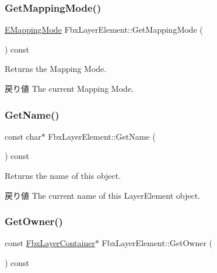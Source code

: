 \mbox{\label{class_fbx_layer_element_a3b20bf41d0b5abc9661b8b93e033cddb}} 
\subsubsection{\texorpdfstring{Get\+Mapping\+Mode()}{GetMappingMode()}}
{\footnotesize\ttfamily \hyperlink{class_fbx_layer_element_a5a40e95db30ae9f94611dc3f1568af26}{E\+Mapping\+Mode} Fbx\+Layer\+Element\+::\+Get\+Mapping\+Mode (\begin{DoxyParamCaption}{ }\end{DoxyParamCaption}) const}

Returns the Mapping Mode. \begin{DoxyReturn}{戻り値}
The current Mapping Mode. 
\end{DoxyReturn}
\mbox{\label{class_fbx_layer_element_af6ca442eaaaac61cec689cf7e39138a6}} 
\subsubsection{\texorpdfstring{Get\+Name()}{GetName()}}
{\footnotesize\ttfamily const char$\ast$ Fbx\+Layer\+Element\+::\+Get\+Name (\begin{DoxyParamCaption}{ }\end{DoxyParamCaption}) const}

Returns the name of this object. \begin{DoxyReturn}{戻り値}
The current name of this Layer\+Element object. 
\end{DoxyReturn}
\mbox{\label{class_fbx_layer_element_a1e83210626684c844505ffd115c27dfd}} 
\subsubsection{\texorpdfstring{Get\+Owner()}{GetOwner()}}
{\footnotesize\ttfamily const \hyperlink{class_fbx_layer_container}{Fbx\+Layer\+Container}$\ast$ Fbx\+Layer\+Element\+::\+Get\+Owner (\begin{DoxyParamCaption}{ }\end{DoxyParamCaption}) const}

